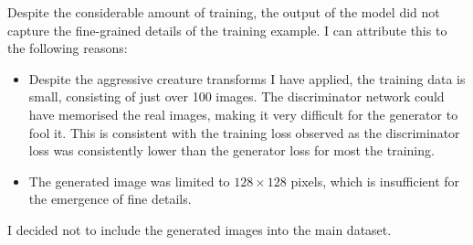 \documentclass[12pt,a4paper,twoside,openany]{report}
\begin{document}
Despite the considerable amount of training, the output of the model did not capture the fine-grained details of the training example. I can attribute this to the following reasons:
\begin{itemize}
    \item Despite the aggressive creature transforms I have applied, the training data is small, consisting of just over 100 images. The discriminator network could have memorised the real images, making it very difficult for the generator to fool it. This is consistent with the training loss observed as the discriminator loss was consistently lower than the generator loss for most the training.
    \item The generated image was limited to $128 \times 128$ pixels, which is insufficient for the emergence of fine details.
\end{itemize}

I decided not to include the generated images into the main dataset.
\end{document}
